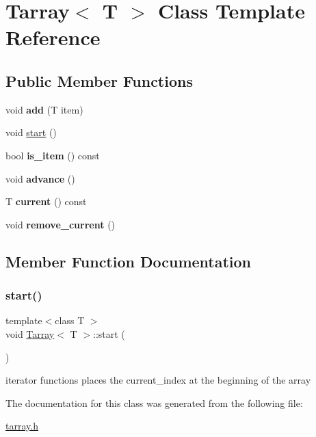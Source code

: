 \hypertarget{classTarray}{}\section{Tarray$<$ T $>$ Class Template Reference}
\label{classTarray}
\subsection*{Public Member Functions}
\begin{DoxyCompactItemize}
\item 
\hypertarget{classTarray_a973a89fb0a3fe40c1680f6cae63981ad}{}\label{classTarray_a973a89fb0a3fe40c1680f6cae63981ad} 
void {\bfseries add} (T item)
\item 
void \hyperlink{classTarray_afdf48d2a03b6b1c110818998b6a86a38}{start} ()
\item 
\hypertarget{classTarray_ab4047d306cc681cee5b665f0cca887f1}{}\label{classTarray_ab4047d306cc681cee5b665f0cca887f1} 
bool {\bfseries is\+\_\+item} () const
\item 
\hypertarget{classTarray_a5bd5dd08f5bfe1c2a5dab59ad7896ecf}{}\label{classTarray_a5bd5dd08f5bfe1c2a5dab59ad7896ecf} 
void {\bfseries advance} ()
\item 
\hypertarget{classTarray_a60bc796c7843e2edaae82d42c15c4360}{}\label{classTarray_a60bc796c7843e2edaae82d42c15c4360} 
T {\bfseries current} () const
\item 
\hypertarget{classTarray_af1728e8ed47a8de0fd3eedfa526b0c43}{}\label{classTarray_af1728e8ed47a8de0fd3eedfa526b0c43} 
void {\bfseries remove\+\_\+current} ()
\end{DoxyCompactItemize}


\subsection{Member Function Documentation}
\hypertarget{classTarray_afdf48d2a03b6b1c110818998b6a86a38}{}\label{classTarray_afdf48d2a03b6b1c110818998b6a86a38} 
\subsubsection{\texorpdfstring{start()}{start()}}
{\footnotesize\ttfamily template$<$class T $>$ \\
void \hyperlink{classTarray}{Tarray}$<$ T $>$\+::start (\begin{DoxyParamCaption}{ }\end{DoxyParamCaption})}

iterator functions places the current\+\_\+index at the beginning of the array 

The documentation for this class was generated from the following file\+:\begin{DoxyCompactItemize}
\item 
\hyperlink{tarray_8h}{tarray.\+h}\end{DoxyCompactItemize}
